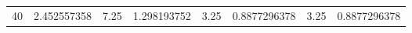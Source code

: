 \begin{tabular}{rrrrrrrr}
40 & 2.452557358 & 7.25 & 1.298193752 & 3.25 & 0.8877296378 & 3.25 & 0.8877296378 \\
\end{tabular}
